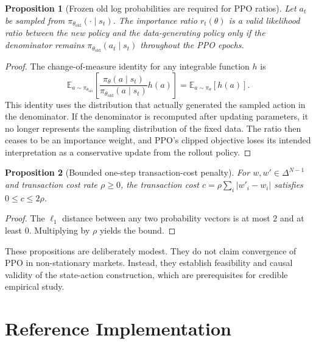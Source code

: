 \documentclass[11pt]{article}
\newtheorem{proposition}{Proposition}
\newcommand{\simplex}{\Delta^{N-1}}
\newcommand{\E}{\mathbb{E}}
\newcommand{\1}{\mathbf{1}}
\begin{document}
\begin{proposition}[Frozen old log probabilities are required for PPO ratios]
Let $a_t$ be sampled from $\pi_{\theta_{\mathrm{old}}}(\cdot\mid s_t)$. The
importance ratio $r_t(\theta)$ is a valid likelihood ratio between the new
policy and the data-generating policy only if the denominator remains
$\pi_{\theta_{\mathrm{old}}}(a_t\mid s_t)$ throughout the PPO epochs.
\end{proposition}

\begin{proof}
The change-of-measure identity for any integrable function $h$ is
\[
\E_{a\sim\pi_{\theta_{\mathrm{old}}}}
\left[
\frac{\pi_\theta(a\mid s_t)}
{\pi_{\theta_{\mathrm{old}}}(a\mid s_t)}
h(a)
\right]
=
\E_{a\sim\pi_\theta}[h(a)].
\]
This identity uses the distribution that actually generated the sampled action
in the denominator. If the denominator is recomputed after updating parameters,
it no longer represents the sampling distribution of the fixed data. The ratio
then ceases to be an importance weight, and PPO's clipped objective loses its
intended interpretation as a conservative update from the rollout policy.
\end{proof}

\begin{proposition}[Bounded one-step transaction-cost penalty]
For $w,w'\in\simplex$ and transaction cost rate $\rho\ge0$, the transaction
cost $c=\rho\sum_i|w'_i-w_i|$ satisfies $0\le c\le 2\rho$.
\end{proposition}

\begin{proof}
The $\ell_1$ distance between any two probability vectors is at most $2$ and at
least $0$. Multiplying by $\rho$ yields the bound.
\end{proof}

These propositions are deliberately modest. They do not claim convergence of
PPO in non-stationary markets. Instead, they establish feasibility and causal
validity of the state-action construction, which are prerequisites for credible
empirical study.

\section{Reference Implementation}
\end{document}
